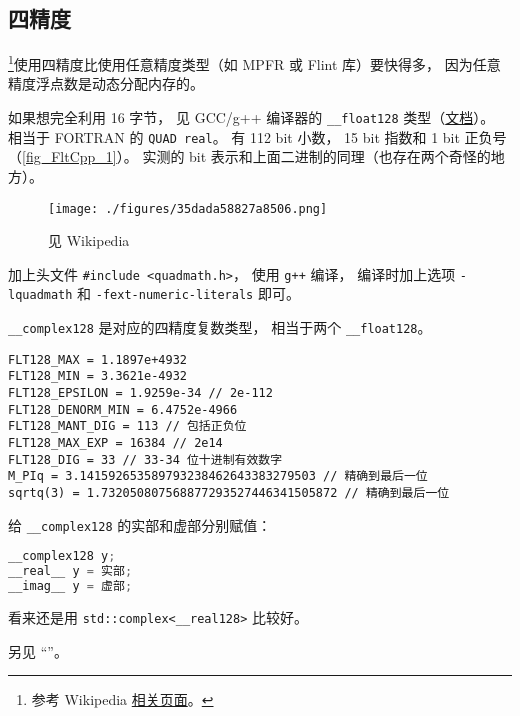 \subsection{四精度}
\footnote{参考 Wikipedia \href{https://en.wikipedia.org/wiki/Quadruple-precision_floating-point_format}{相关页面}。}使用四精度比使用任意精度类型（如 MPFR 或 Flint 库）要快得多， 因为任意精度浮点数是动态分配内存的。

如果想完全利用 16 字节， 见 GCC/g++ 编译器的 \verb`__float128` 类型（\href{https://gcc.gnu.org/onlinedocs/gcc-8.1.0/libquadmath.pdf}{文档}）。 相当于 FORTRAN 的 \verb`QUAD real`。 有 112 bit 小数， 15 bit 指数和 1 bit 正负号（\autoref{fig_FltCpp_1}）。 实测的 bit 表示和上面二进制的同理（也存在两个奇怪的地方）。

\begin{figure}[ht]
\centering
\texttt{[image: ./figures/35dada58827a8506.png]}
\caption{见 Wikipedia} \label{fig_FltCpp_1}
\end{figure}


加上头文件 \verb`#include <quadmath.h>`， 使用 \verb`g++` 编译， 编译时加上选项 \verb`-lquadmath` 和 \verb`-fext-numeric-literals` 即可。

\verb`__complex128` 是对应的四精度复数类型， 相当于两个 \verb`__float128`。

\begin{lstlisting}[language=none]
FLT128_MAX = 1.1897e+4932
FLT128_MIN = 3.3621e-4932
FLT128_EPSILON = 1.9259e-34 // 2e-112
FLT128_DENORM_MIN = 6.4752e-4966
FLT128_MANT_DIG = 113 // 包括正负位
FLT128_MAX_EXP = 16384 // 2e14
FLT128_DIG = 33 // 33-34 位十进制有效数字
M_PIq = 3.141592653589793238462643383279503 // 精确到最后一位
sqrtq(3) = 1.732050807568877293527446341505872 // 精确到最后一位
\end{lstlisting}

给 \verb`__complex128` 的实部和虚部分别赋值：
\begin{lstlisting}[language=cpp]
__complex128 y;
__real__ y = 实部;
__imag__ y = 虚部;
\end{lstlisting}
看来还是用 \verb`std::complex<__real128>` 比较好。

另见 “”。
